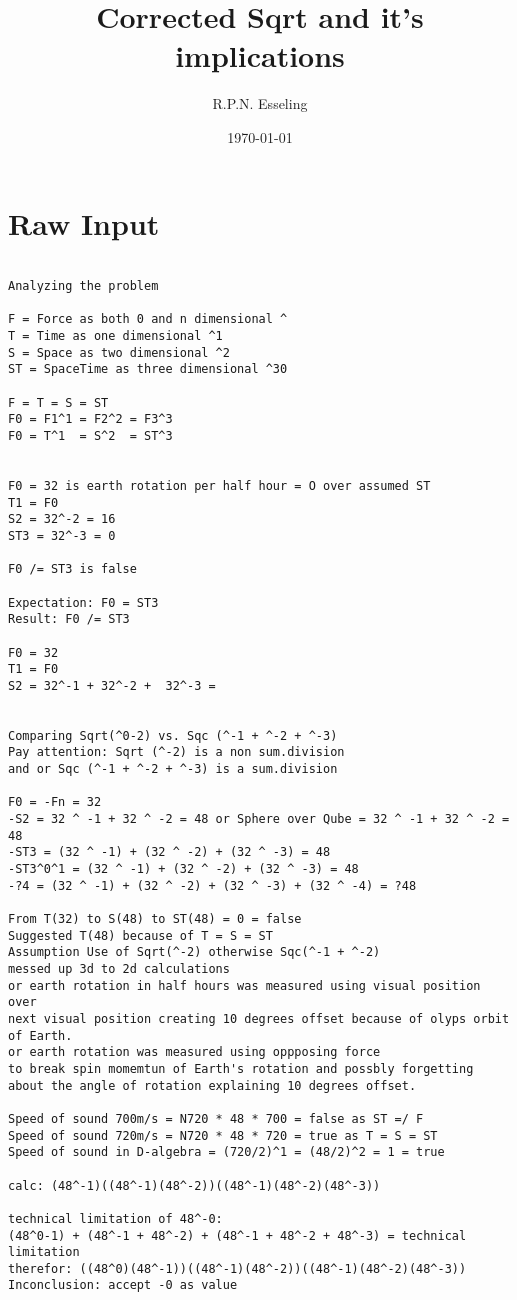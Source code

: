 \documentclass{article}
\title{Corrected Sqrt and it's implications}
\author{R.P.N. Esseling}
\date{\today}
\begin{document}
\maketitle

\section*{Raw Input}
\begin{verbatim}

Analyzing the problem

F = Force as both 0 and n dimensional ^
T = Time as one dimensional ^1
S = Space as two dimensional ^2
ST = SpaceTime as three dimensional ^30

F = T = S = ST
F0 = F1^1 = F2^2 = F3^3
F0 = T^1  = S^2  = ST^3


F0 = 32 is earth rotation per half hour = O over assumed ST 
T1 = F0
S2 = 32^-2 = 16 
ST3 = 32^-3 = 0

F0 /= ST3 is false

Expectation: F0 = ST3
Result: F0 /= ST3

F0 = 32
T1 = F0
S2 = 32^-1 + 32^-2 +  32^-3 = 


Comparing Sqrt(^0-2) vs. Sqc (^-1 + ^-2 + ^-3)
Pay attention: Sqrt (^-2) is a non sum.division 
and or Sqc (^-1 + ^-2 + ^-3) is a sum.division

F0 = -Fn = 32 
-S2 = 32 ^ -1 + 32 ^ -2 = 48 or Sphere over Qube = 32 ^ -1 + 32 ^ -2 = 48
-ST3 = (32 ^ -1) + (32 ^ -2) + (32 ^ -3) = 48
-ST3^0^1 = (32 ^ -1) + (32 ^ -2) + (32 ^ -3) = 48
-?4 = (32 ^ -1) + (32 ^ -2) + (32 ^ -3) + (32 ^ -4) = ?48

From T(32) to S(48) to ST(48) = 0 = false
Suggested T(48) because of T = S = ST
Assumption Use of Sqrt(^-2) otherwise Sqc(^-1 + ^-2) 
messed up 3d to 2d calculations 
or earth rotation in half hours was measured using visual position over 
next visual position creating 10 degrees offset because of olyps orbit of Earth.
or earth rotation was measured using oppposing force
to break spin momemtun of Earth's rotation and possbly forgetting 
about the angle of rotation explaining 10 degrees offset.

Speed of sound 700m/s = N720 * 48 * 700 = false as ST =/ F
Speed of sound 720m/s = N720 * 48 * 720 = true as T = S = ST 
Speed of sound in D-algebra = (720/2)^1 = (48/2)^2 = 1 = true

calc: (48^-1)((48^-1)(48^-2))((48^-1)(48^-2)(48^-3))

technical limitation of 48^-0: 
(48^0-1) + (48^-1 + 48^-2) + (48^-1 + 48^-2 + 48^-3) = technical limitation
therefor: ((48^0)(48^-1))((48^-1)(48^-2))((48^-1)(48^-2)(48^-3))
Inconclusion: accept -0 as value



\end{verbatim}
\end{document}
